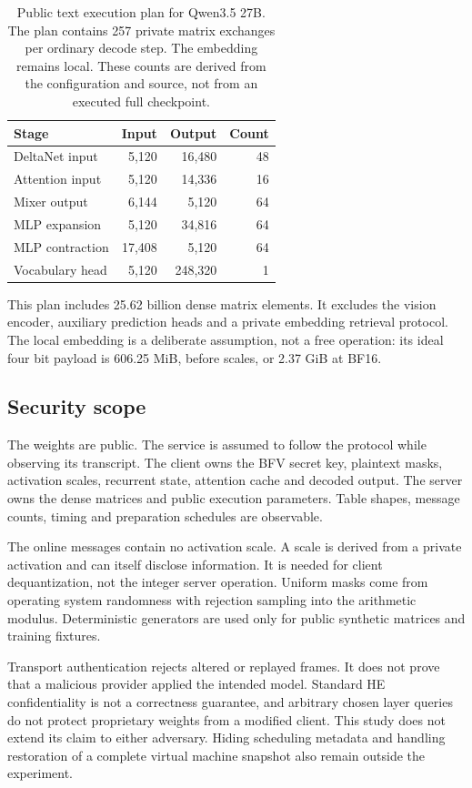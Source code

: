 \documentclass[10pt,twocolumn]{article}
\begin{document}
\begin{table}[t]
\centering\small
\setlength{\tabcolsep}{4.5pt}
\begin{tabular}{lrrr}
\toprule
Stage & Input & Output & Count\\
\midrule
DeltaNet input & 5,120 & 16,480 & 48\\
Attention input & 5,120 & 14,336 & 16\\
Mixer output & 6,144 & 5,120 & 64\\
MLP expansion & 5,120 & 34,816 & 64\\
MLP contraction & 17,408 & 5,120 & 64\\
Vocabulary head & 5,120 & 248,320 & 1\\
\bottomrule
\end{tabular}
\caption{Public text execution plan for Qwen3.5 27B. The plan contains 257
private matrix exchanges per ordinary decode step. The embedding remains
local. These counts are derived from the configuration and source, not from an
executed full checkpoint.}
\label{tab:stages}
\end{table}

This plan includes 25.62 billion dense matrix elements. It excludes the vision
encoder, auxiliary prediction heads and a private embedding retrieval protocol.
The local embedding is a deliberate assumption, not a free operation: its
ideal four bit payload is 606.25 MiB, before scales, or 2.37 GiB at BF16.

\subsection{Security scope}
The weights are public. The service is assumed to follow the protocol while
observing its transcript. The client owns the BFV secret key, plaintext masks,
activation scales, recurrent state, attention cache and decoded output. The
server owns the dense matrices and public execution parameters. Table shapes,
message counts, timing and preparation schedules are observable.

The online messages contain no activation scale. A scale is derived from a
private activation and can itself disclose information. It is needed for
client dequantization, not the integer server operation. Uniform masks come
from operating system randomness with rejection sampling into the arithmetic
modulus. Deterministic generators are used only for public synthetic matrices
and training fixtures.

Transport authentication rejects altered or replayed frames. It does not prove
that a malicious provider applied the intended model. Standard HE
confidentiality is not a correctness guarantee, and arbitrary chosen layer
queries do not protect proprietary weights from a modified client. This study
does not extend its claim to either adversary. Hiding scheduling metadata and
handling restoration of a complete virtual machine snapshot also remain outside
the experiment.
\end{document}
